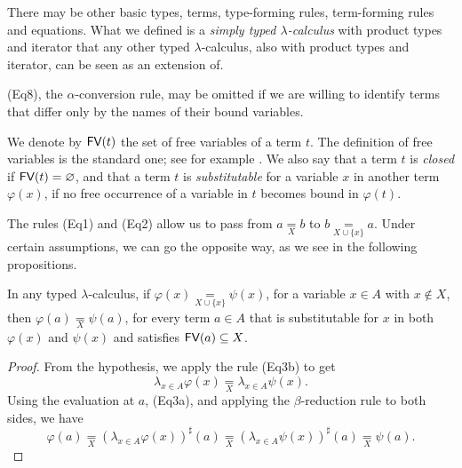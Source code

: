 \begin{remark}
    There may be other basic types, terms, type-forming rules, term-forming rules and equations.
    What we defined is a \emph{simply typed $\lambda$-calculus} with product types and iterator that any other typed $\lambda$-calculus, also with product types and iterator, can be seen as an extension of.
\end{remark}

\begin{remark}
    (Eq8), the $\alpha$-conversion rule, may be omitted if we are willing to identify terms that differ only by the names of their bound variables.
\end{remark}

\begin{notation}\label{not:free-variables-and-closed-terms}
    We denote by $\textsf{FV}(t)$ the set of free variables of a term $t$. The definition of free variables is the standard one; see for example \cite{Carpenter1997}.
    We also say that a term $t$ is \emph{closed} if $\textsf{FV}(t) = \varnothing$, and that a term $t$ is \emph{substitutable} for a variable $x$ in another term $\varphi(x)$,
    if no free occurrence of a variable in $t$ becomes bound in $\varphi(t)$.
\end{notation}

The rules (Eq1) and (Eq2) allow us to pass from $a \underset{X}{=} b$ to $b \underset{X \cup \{x\}}{=} a$.
Under certain assumptions, we can go the opposite way, as we see in the following propositions.

\begin{proposition}
    In any typed $\lambda$-calculus, if $\varphi(x) \underset{X \cup \{x\}}{=} \psi(x)$, for a variable $x \in A$ with $x \notin X$, then $\varphi(a) \underset{X}{=} \psi(a)$, for every term $a \in A$ that is substitutable for $x$ in both $\varphi(x)$ and $\psi(x)$ and satisfies $\textsf{FV}(a) \subseteq X$.
\end{proposition}

\begin{proof}
    From the hypothesis, we apply the rule (Eq3b) to get
    \[ \lambda_{x \in A} \varphi(x) \underset{X}{=} \lambda_{x \in A} \psi(x). \]
    Using the evaluation at $a$, (Eq3a), and applying the $\beta$-reduction rule to both sides, we have
    \[ \varphi(a) \underset{X}{=} (\lambda_{x \in A} \varphi(x))^\sharp(a) \underset{X}{=} (\lambda_{x \in A} \psi(x))^\sharp(a) \underset{X}{=} \psi(a). \]
\end{proof}

